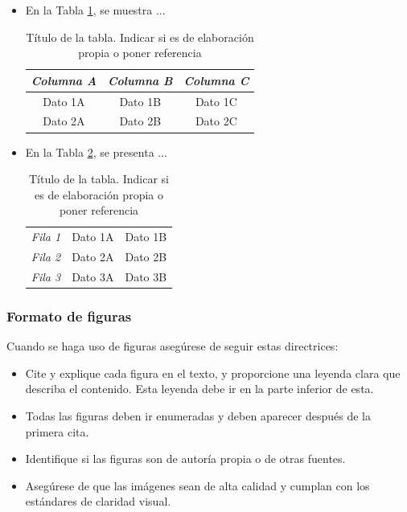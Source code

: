 \documentclass[fleqn]{Paquetes/RevDigMatEduInt}
\begin{document}
\begin{itemize}

\item En la Tabla \ref{tabla:01}, se muestra ...

\begin{table}[ht!!!]
	\centering
	\begin{minipage}{0.7\textwidth}
	\caption{Título de la tabla. Indicar si es de elaboración propia o poner referencia}
	\centering
	\begin{tabular}{ccc}    \toprule
		\emph{Columna A} & \emph{Columna B} & \emph{Columna C}  \\ \midrule
		Dato 1A & Dato 1B & Dato 1C\\ 
		Dato 2A & Dato 2B & Dato 2C\\ \bottomrule
	\end{tabular}
	\label{tabla:01}
	\end{minipage}
\end{table}

\item En la Tabla \ref{tabla:02}, se presenta ...

\begin{table}[ht!!!]
	\centering
	\begin{minipage}{0.7\textwidth}
	\caption{Título de la tabla. Indicar si es de elaboración propia o poner referencia}
	\centering
	\begin{tabular}{|c|cc|}    
		\emph{Fila 1} & Dato 1A & Dato 1B \\
		\emph{Fila 2} & Dato 2A & Dato 2B \\
		\emph{Fila 3} & Dato 3A & Dato 3B \\ 
	\end{tabular}
	\label{tabla:02}
	\end{minipage}
\end{table}

\end{itemize}

\subsubsection{Formato de figuras}

Cuando se haga uso de figuras asegúrese de seguir estas directrices:

\begin{itemize}
\item Cite y explique cada figura en el texto, y proporcione una leyenda clara que describa el contenido. Esta leyenda debe ir en la parte inferior de esta.
\item Todas las figuras deben ir enumeradas y deben aparecer después de la primera cita.
\item Identifique si las figuras son de autoría propia o de otras fuentes.
\item Asegúrese de que las imágenes sean de alta calidad y cumplan con los estándares de claridad visual.
\end{itemize}
\end{document}

